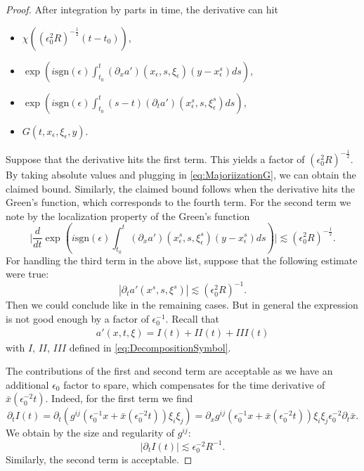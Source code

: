 \documentclass{amsart}
\theoremstyle{definition}
\begin{document}
\begin{proof}
\smallskip

After integration by parts in time, the derivative can hit
\begin{itemize}
    \item $\chi((\epsilon_0^2 R)^{-\frac{1}{2}}(t-t_0))$, 
    \item $\exp(i \text{sgn}(\epsilon) \int_{t_0}^t (\partial_x a')(x_\epsilon,s,\xi_\epsilon)(y-x_{\epsilon}^s) ds) $, 
    \item $\exp( i \text{sgn}(\epsilon) \int_{t_0}^t (s-t) (\partial_t a')(x_{\epsilon}^s,s,\xi_{\epsilon}^s) ds)$, 
    \item $G(t,x_{\epsilon},\xi_{\epsilon},y)$.
\end{itemize}
Suppose that the derivative hits the first term. This yields a factor of $(\epsilon_0^2 R)^{-\frac{1}{2}}$. By taking absolute values and plugging in \eqref{eq:MajoriizationG}, we can obtain the claimed bound. Similarly, the claimed bound follows when the derivative hits the Green's function, which corresponds to the fourth term. For the second term we note by the localization property of the Green's function
\begin{equation*}
    \big| \frac{d}{dt} \exp(i \text{sgn}(\epsilon) \int_{t_0}^t (\partial_x a')(x^s_{\epsilon},s,\xi_{\epsilon}^s) (y-x_{\epsilon}^s) ds ) \big| \lesssim (\epsilon_0^2 R)^{-\frac{1}{2}}.
\end{equation*}
For handling the third term in the above list, suppose that the following estimate were true:
\begin{equation*}
| \partial_t a'(x^s,s,\xi^s) | \lesssim (\epsilon_0^2 R)^{-1}.
\end{equation*}
Then we could conclude like in the remaining cases. But in general the expression is not good enough by a factor of $\epsilon_0^{-1}$. 
Recall that
\begin{equation*}
\begin{split}
a'(x,t,\xi) = I(t) + II(t) + III(t)
\end{split}
\end{equation*}
with $I$, $II$, $III$ defined in \eqref{eq:DecompositionSymbol}.

The contributions of the first and second term are acceptable as we have an additional $\epsilon_0$ factor to spare, which compensates for the time derivative of $\bar{x}(\epsilon_0^{-2} t)$.
Indeed, for the first term we find
\begin{equation*}
\partial_t I(t) = \partial_t ( g^{ij}(\epsilon_0^{-1} x + \bar{x}(\epsilon_0^{-2} t)) \xi_i \xi_j) = \partial_x g^{ij}(\epsilon_0^{-1} x+ \bar{x}(\epsilon_0^{-2} t)) \xi_i \xi_j \epsilon_0^{-2} \partial_t \bar{x}.
\end{equation*}
We obtain by the size and regularity of $g^{ij}$:
\begin{equation*}
| \partial_t I(t) | \lesssim \epsilon_0^{-2} R^{-1}.
\end{equation*}
Similarly, the second term is acceptable.


\end{proof}
\end{document}
